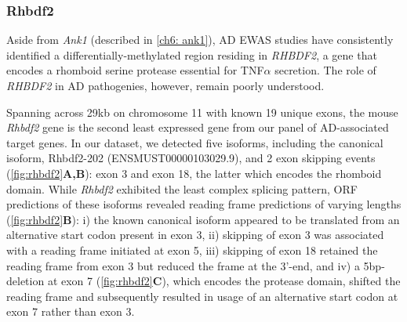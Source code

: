 \newpage
\subsubsection{Rhbdf2}
Aside from \textit{Ank1} (described in \cref{ch6: ank1}), AD EWAS studies have consistently identified a differentially-methylated region residing in \textit{RHBDF2}, a gene that encodes a rhomboid serine protease essential for  TNF$\alpha$ secretion. The role of \textit{RHBDF2} in AD pathogenies, however, remain poorly understood.   

Spanning across 29kb on chromosome 11 with known 19 unique exons, the mouse \textit{Rhbdf2} gene is the second least expressed gene from our panel of AD-associated target genes. In our dataset, we detected five isoforms, including the canonical isoform, Rhbdf2-202 (ENSMUST00000103029.9), and 2 exon skipping events (\cref{fig:rhbdf2}\textbf{A,B}): exon 3 and exon 18, the latter which encodes the rhomboid domain. While \textit{Rhbdf2} exhibited the least complex splicing pattern, ORF predictions of these isoforms revealed reading frame predictions of varying lengths (\cref{fig:rhbdf2}\textbf{B}): i) the known canonical isoform appeared to be translated from an alternative start codon present in exon 3, ii) skipping of exon 3 was associated with a reading frame initiated at exon 5, iii) skipping of exon 18 retained the reading frame from exon 3 but reduced the frame at the 3'-end, and iv) a 5bp-deletion at exon 7 (\cref{fig:rhbdf2}\textbf{C}), which encodes the protease domain, shifted the reading frame and subsequently resulted in usage of an alternative start codon at exon 7 rather than exon 3.  


